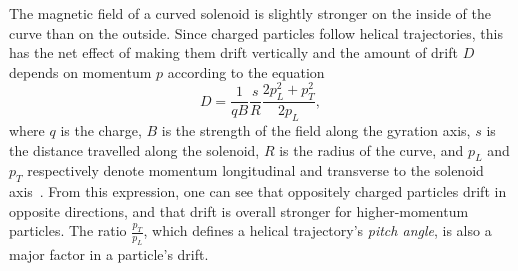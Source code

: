 The magnetic field of a curved solenoid is slightly stronger on the inside of
the curve than on the outside. Since charged particles follow helical
trajectories, this has the net effect of making them drift vertically and the
amount of drift $D$ depends on momentum $p$ according to the equation
\begin{equation*}
    D = \frac{1}{q B} \frac{s}{R} \frac{2 p^2_L + p^2_T}{2 p_L},
\end{equation*}
where $q$ is the charge, $B$ is the strength of the field along the gyration
axis, $s$ is the distance travelled along the solenoid, $R$ is the radius of the
curve, and $p_L$ and $p_T$ respectively denote momentum longitudinal and
transverse to the solenoid axis~\cite{ben_thesis}. From this expression, one can see that
oppositely charged particles drift in opposite directions, and that drift is
overall stronger for higher-momentum particles. The ratio $\frac{p_T}{p_L}$,
which defines a helical trajectory's \emph{pitch angle}, is also a major
factor in a particle's drift.

